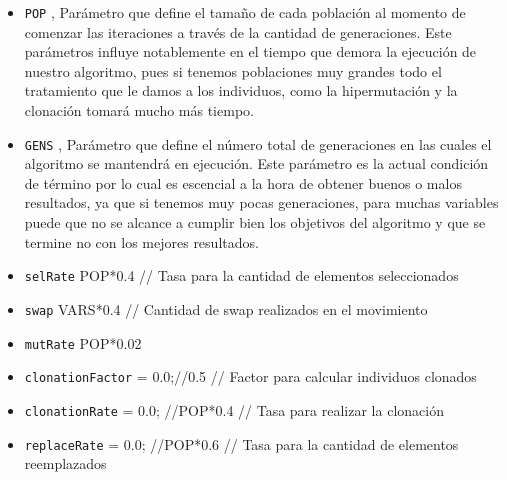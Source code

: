 %

\begin{itemize}
	\item \texttt{POP} , Parámetro que define el tamaño de cada población al momento de comenzar
			las iteraciones a través de la cantidad de generaciones.
			Este parámetros influye notablemente en el tiempo que demora la ejecución de nuestro algoritmo,
			pues si tenemos poblaciones muy grandes todo el tratamiento que le damos a los individuos,
			como la hipermutación y la clonación tomará mucho más tiempo.
	\item \texttt{GENS} , Parámetro que define el número total de generaciones en las cuales
			el algoritmo se mantendrá en ejecución. Este parámetro es la actual condición de término
			por lo cual es escencial a la hora de obtener buenos o malos resultados, ya que si tenemos
			muy pocas generaciones, para muchas variables puede que no se alcance a cumplir bien los
			objetivos del algoritmo y que se termine no con los mejores resultados.
	\item \texttt{selRate} POP*0.4  // Tasa para la cantidad de elementos seleccionados
	\item \texttt{swap} VARS*0.4 // Cantidad de swap realizados en el movimiento
	\item \texttt{mutRate} POP*0.02

	\item \texttt{clonationFactor} = 0.0;//0.5 // Factor para calcular individuos clonados
	\item \texttt{clonationRate} = 0.0; //POP*0.4 // Tasa para realizar la clonación
	\item \texttt{replaceRate} =  0.0; //POP*0.6  // Tasa para la cantidad de elementos reemplazados
\end{itemize}
